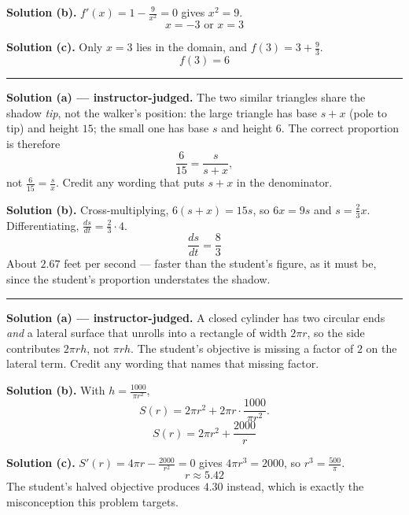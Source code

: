 \documentclass[12pt]{article}
\begin{document}
\textbf{Solution (b).} $f'(x) = 1 - \frac{9}{x^2} = 0$ gives $x^2 = 9$.
\[ \boxed{x = -3 \text{ or } x = 3} \]

\textbf{Solution (c).} Only $x = 3$ lies in the domain, and
$f(3) = 3 + \frac{9}{3}$.
\[ \boxed{f(3) = 6} \]

\vspace{0.2cm}\noindent\rule{\linewidth}{0.2pt}


\textbf{Solution (a) --- instructor-judged.} The two similar triangles share the
shadow \emph{tip}, not the walker's position: the large triangle has base
$s + x$ (pole to tip) and height $15$; the small one has base $s$ and height
$6$. The correct proportion is therefore
\[ \frac{6}{15} = \frac{s}{s + x}, \]
not $\frac{6}{15} = \frac{s}{x}$. Credit any wording that puts $s + x$ in the
denominator.

\textbf{Solution (b).} Cross-multiplying, $6(s + x) = 15s$, so $6x = 9s$ and
$s = \frac{2}{3}x$. Differentiating, $\frac{ds}{dt} = \frac{2}{3}\cdot 4$.
\[ \boxed{\frac{ds}{dt} = \frac{8}{3}} \]
About $2.67$ feet per second --- faster than the student's figure, as it must
be, since the student's proportion understates the shadow.

\vspace{0.2cm}\noindent\rule{\linewidth}{0.2pt}


\textbf{Solution (a) --- instructor-judged.} A closed cylinder has two circular
ends \emph{and} a lateral surface that unrolls into a rectangle of width
$2\pi r$, so the side contributes $2\pi r h$, not $\pi r h$. The student's
objective is missing a factor of $2$ on the lateral term. Credit any wording
that names that missing factor.

\textbf{Solution (b).} With $h = \frac{1000}{\pi r^2}$,
\[ S(r) = 2\pi r^2 + 2\pi r\cdot\frac{1000}{\pi r^2}. \]
\[ \boxed{S(r) = 2\pi r^2 + \frac{2000}{r}} \]

\textbf{Solution (c).} $S'(r) = 4\pi r - \frac{2000}{r^2} = 0$ gives
$4\pi r^3 = 2000$, so $r^3 = \frac{500}{\pi}$.
\[ \boxed{r \approx 5.42} \]
The student's halved objective produces $4.30$ instead, which is exactly the
misconception this problem targets.
\end{document}

